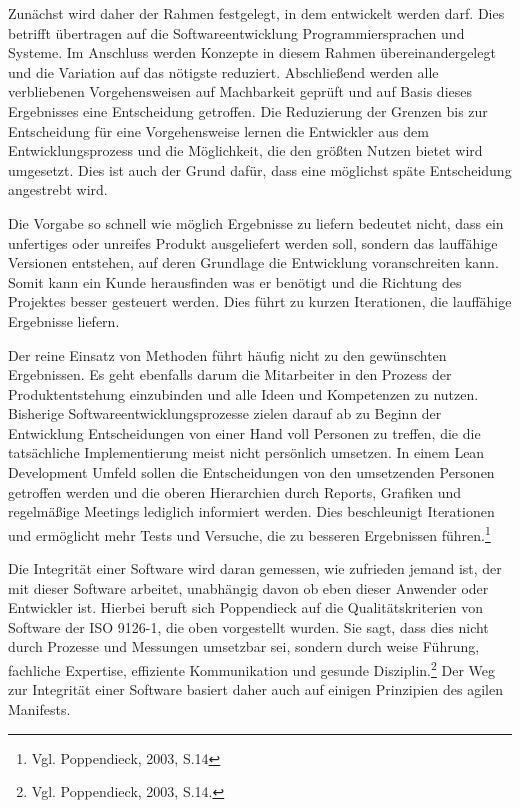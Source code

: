                 Zunächst wird daher der Rahmen festgelegt, in dem entwickelt werden darf. Dies betrifft übertragen auf die Softwareentwicklung Programmiersprachen und Systeme. Im Anschluss werden Konzepte in diesem Rahmen übereinandergelegt und die Variation auf das nötigste reduziert. Abschließend werden alle verbliebenen Vorgehensweisen auf Machbarkeit geprüft und auf Basis dieses Ergebnisses eine Entscheidung getroffen. Die Reduzierung der Grenzen bis zur Entscheidung für eine Vorgehensweise lernen die Entwickler aus dem Entwicklungsprozess und die Möglichkeit, die den größten Nutzen bietet wird umgesetzt.
                Dies ist auch der Grund dafür, dass eine möglichst späte Entscheidung angestrebt wird.

                Die Vorgabe so schnell wie möglich Ergebnisse zu liefern bedeutet nicht, dass ein unfertiges oder unreifes Produkt ausgeliefert werden soll, sondern das lauffähige Versionen entstehen, auf deren Grundlage die Entwicklung voranschreiten kann. Somit kann ein Kunde herausfinden was er benötigt und die Richtung des Projektes besser gesteuert werden. Dies führt zu kurzen Iterationen, die lauffähige Ergebnisse liefern.

                Der reine Einsatz von Methoden führt häufig nicht zu den gewünschten Ergebnissen. Es geht ebenfalls darum die Mitarbeiter in den Prozess der Produktentstehung einzubinden und alle Ideen und Kompetenzen zu nutzen. Bisherige Softwareentwicklungsprozesse zielen darauf ab zu Beginn der Entwicklung Entscheidungen von einer Hand voll Personen zu treffen, die die tatsächliche Implementierung meist nicht persönlich umsetzen. In einem Lean Development Umfeld sollen die Entscheidungen von den umsetzenden Personen getroffen werden und die oberen Hierarchien durch Reports, Grafiken und regelmäßige Meetings lediglich informiert werden. Dies beschleunigt Iterationen und ermöglicht mehr Tests und Versuche, die zu besseren Ergebnissen führen.\footnote{Vgl. Poppendieck, 2003, S.14}

                Die Integrität einer Software wird daran gemessen, wie zufrieden jemand ist, der mit dieser Software arbeitet, unabhängig davon ob eben dieser Anwender oder Entwickler ist. Hierbei beruft sich Poppendieck auf die Qualitätskriterien von Software der ISO 9126-1, die oben vorgestellt wurden. Sie sagt, dass dies nicht durch Prozesse und Messungen umsetzbar sei, sondern durch weise Führung, fachliche Expertise, effiziente Kommunikation und gesunde Disziplin.\footnote{Vgl. Poppendieck, 2003, S.14.} Der Weg zur Integrität einer Software basiert daher auch auf einigen Prinzipien des agilen Manifests.

